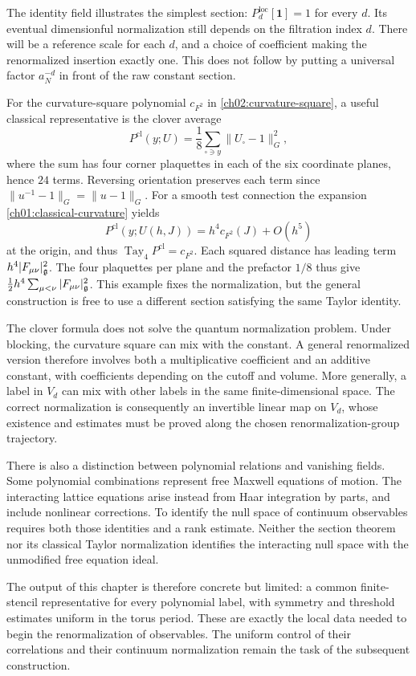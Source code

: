 The identity field illustrates the simplest section: $P_d^{\mathrm{loc}}[\mathbf1]=1$
for every $d$. Its eventual dimensionful normalization still depends on the
filtration index $d$. There will be a reference scale for each $d$, and a choice of
coefficient making the renormalized insertion exactly one. This does not
follow by putting a universal factor $a_N^{-d}$ in front of the raw
constant section.

For the curvature-square polynomial $c_{F^2}$ in
\eqref{ch02:curvature-square}, a useful classical representative is the
clover average
\begin{equation}
 P^{\mathrm{cl}}(y;U)=\frac18\sum_{\square\ni y}\|U_\square-1\|_G^2,
 \label{ch02:clover}
\end{equation}
where the sum has four corner plaquettes in each of the six coordinate
planes, hence $24$ terms. Reversing orientation preserves each term
since $\|u^{-1}-1\|_G=\|u-1\|_G$.
For a smooth test connection the expansion
\eqref{ch01:classical-curvature} yields
\[
 P^{\mathrm{cl}}(y;U(h,J))
     =h^4 c_{F^2}(J)+O(h^5)
\]
at the origin, and thus $\operatorname{Tay}_4P^{\mathrm{cl}}=c_{F^2}$.
Each squared distance has leading term $h^4|F_{\mu\nu}|_{\mathfrak g}^2$.
The four plaquettes per plane and the prefactor $1/8$ thus give
$\tfrac12 h^4\sum_{\mu<\nu}|F_{\mu\nu}|_{\mathfrak g}^2$.
This example fixes the normalization, but the general
construction is free to use a different section satisfying the same
Taylor identity.

The clover formula does not solve the quantum normalization problem.
Under blocking, the curvature square can mix with the constant. A general
renormalized version therefore involves both a multiplicative coefficient
and an additive constant, with coefficients depending on the cutoff and
volume. More generally, a label in $V_d$ can mix with other labels in the
same finite-dimensional space. The correct normalization is consequently
an invertible linear map on $V_d$, whose existence and estimates must be
proved along the chosen renormalization-group trajectory.

There is also a distinction between polynomial relations and vanishing
fields. Some polynomial combinations represent free Maxwell equations of
motion. The interacting lattice equations arise instead from Haar
integration by parts, and include nonlinear corrections. To identify the
null space of continuum observables requires both those identities and a
rank estimate. Neither the section theorem nor its classical Taylor
normalization identifies the interacting null space with the unmodified
free equation ideal.

The output of this chapter is therefore concrete but limited: a common
finite-stencil representative for every polynomial label, with symmetry
and threshold estimates uniform in the torus period. These are exactly
the local data needed to begin the renormalization of observables. The
uniform control of their correlations and their continuum normalization
remain the task of the subsequent construction.
